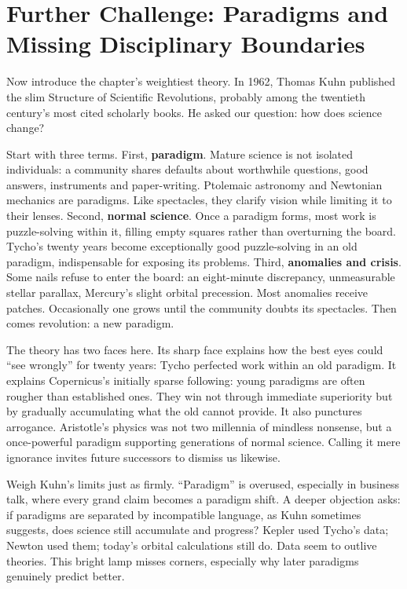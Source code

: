 \section[Further Challenge: Paradigms]{Further Challenge: Paradigms and Missing Disciplinary Boundaries}
Now introduce the chapter's weightiest theory. In 1962, Thomas Kuhn published the slim Structure of Scientific Revolutions, probably among the twentieth century's most cited scholarly books. He asked our question: how does science change?

Start with three terms. First, \textbf{paradigm}. Mature science is not isolated individuals: a community shares defaults about worthwhile questions, good answers, instruments and paper-writing. Ptolemaic astronomy and Newtonian mechanics are paradigms. Like spectacles, they clarify vision while limiting it to their lenses. Second, \textbf{normal science}. Once a paradigm forms, most work is puzzle-solving within it, filling empty squares rather than overturning the board. Tycho's twenty years become exceptionally good puzzle-solving in an old paradigm, indispensable for exposing its problems. Third, \textbf{anomalies and crisis}. Some nails refuse to enter the board: an eight-minute discrepancy, unmeasurable stellar parallax, Mercury's slight orbital precession. Most anomalies receive patches. Occasionally one grows until the community doubts its spectacles. Then comes revolution: a new paradigm.

The theory has two faces here. Its sharp face explains how the best eyes could ``see wrongly'' for twenty years: Tycho perfected work within an old paradigm. It explains Copernicus's initially sparse following: young paradigms are often rougher than established ones. They win not through immediate superiority but by gradually accumulating what the old cannot provide. It also punctures arrogance. Aristotle's physics was not two millennia of mindless nonsense, but a once-powerful paradigm supporting generations of normal science. Calling it mere ignorance invites future successors to dismiss us likewise.

Weigh Kuhn's limits just as firmly. ``Paradigm'' is overused, especially in business talk, where every grand claim becomes a paradigm shift. A deeper objection asks: if paradigms are separated by incompatible language, as Kuhn sometimes suggests, does science still accumulate and progress? Kepler used Tycho's data; Newton used them; today's orbital calculations still do. Data seem to outlive theories. This bright lamp misses corners, especially why later paradigms genuinely predict better.

